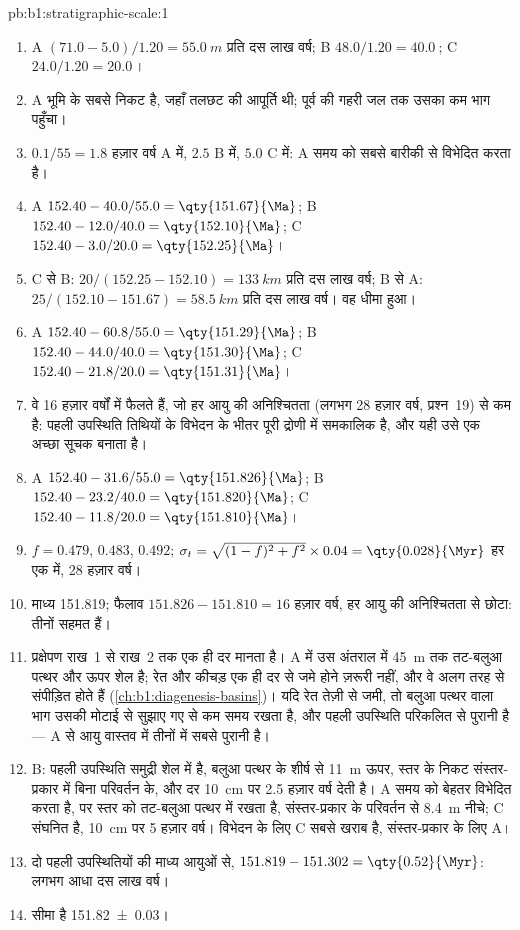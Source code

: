 \begin{solution}{pb:b1:stratigraphic-scale:1}
\begin{enumerate}
  \item A $(71.0 - 5.0)/1.20 = \qty{55.0}{m}$ प्रति दस लाख वर्ष; B $48.0/1.20 = \qty{40.0}{}$; C $24.0/1.20 = \qty{20.0}{}$।
  \item A भूमि के सबसे निकट है, जहाँ तलछट की आपूर्ति थी; पूर्व की गहरी जल तक उसका कम भाग पहुँचा।
  \item $0.1/55 = \num{1.8}$ हज़ार वर्ष A में, $\num{2.5}$ B में, $\num{5.0}$ C में: A समय को सबसे बारीकी से विभेदित करता है।
  \item A $152.40 - 40.0/55.0 = \qty{151.67}{\Ma}$; B $152.40 - 12.0/40.0 =
        \qty{152.10}{\Ma}$; C $152.40 - 3.0/20.0 = \qty{152.25}{\Ma}$।
  \item C से B: $20/(152.25 - 152.10) = \qty{133}{km}$ प्रति दस लाख वर्ष; B से A: $25/(152.10 - 151.67) = \qty{58.5}{km}$ प्रति दस लाख वर्ष। वह धीमा हुआ।
  \item A $152.40 - 60.8/55.0 = \qty{151.29}{\Ma}$; B $152.40 - 44.0/40.0 =
        \qty{151.30}{\Ma}$; C $152.40 - 21.8/20.0 = \qty{151.31}{\Ma}$।
  \item वे \num{16} हज़ार वर्षों में फैलते हैं, जो हर आयु की अनिश्चितता (लगभग \num{28} हज़ार वर्ष, प्रश्न~19) से कम है: पहली उपस्थिति तिथियों के विभेदन के भीतर पूरी द्रोणी में समकालिक है, और यही उसे एक अच्छा सूचक बनाता है।
  \item A $152.40 - 31.6/55.0 = \qty{151.826}{\Ma}$; B $152.40 - 23.2/40.0 =
        \qty{151.820}{\Ma}$; C $152.40 - 11.8/20.0 = \qty{151.810}{\Ma}$।
  \item $f = 0.479$, $0.483$, $0.492$; $\sigma_t = \sqrt{(1 - f)^2 + f^2} \times
        0.04 = \qty{0.028}{\Myr}$ हर एक में, \num{28} हज़ार वर्ष।
  \item माध्य \qty{151.819}{\Ma}; फैलाव $151.826 - 151.810 = \num{16}$ हज़ार वर्ष, हर आयु की अनिश्चितता से छोटा: तीनों सहमत हैं।
  \item प्रक्षेपण राख~1 से राख~2 तक एक ही दर मानता है। A में उस अंतराल में \qty{45}{m} तक तट-बलुआ पत्थर और ऊपर शेल है; रेत और कीचड़ एक ही दर से जमे होने ज़रूरी नहीं, और वे अलग तरह से संपीड़ित होते हैं (\cref{ch:b1:diagenesis-basins})। यदि रेत तेज़ी से जमी, तो बलुआ पत्थर वाला भाग उसकी मोटाई से सुझाए गए से कम समय रखता है, और पहली उपस्थिति परिकलित से पुरानी है --- A से आयु वास्तव में तीनों में सबसे पुरानी है।
  \item B: पहली उपस्थिति समुद्री शेल में है, बलुआ पत्थर के शीर्ष से \qty{11}{m} ऊपर, स्तर के निकट संस्तर-प्रकार में बिना परिवर्तन के, और दर \qty{10}{cm} पर \num{2.5} हज़ार वर्ष देती है। A समय को बेहतर विभेदित करता है, पर स्तर को तट-बलुआ पत्थर में रखता है, संस्तर-प्रकार के परिवर्तन से \qty{8.4}{m} नीचे; C संघनित है, \qty{10}{cm} पर \num{5} हज़ार वर्ष। विभेदन के लिए C सबसे खराब है, संस्तर-प्रकार के लिए A।
  \item दो पहली उपस्थितियों की माध्य आयुओं से, $151.819 - 151.302 =
        \qty{0.52}{\Myr}$: लगभग आधा दस लाख वर्ष।
  \item सीमा है \qty[uncertainty-mode=separate]{151.82(3)}{\Ma}।
\end{enumerate}
\end{solution}
